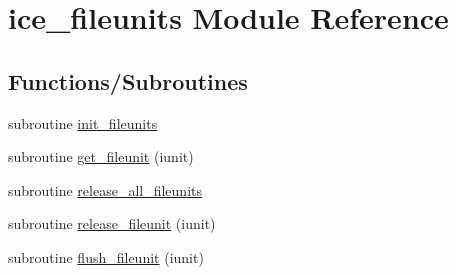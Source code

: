 \hypertarget{namespaceice__fileunits}{
\section{ice\_\-fileunits Module Reference}
\label{namespaceice__fileunits}
}
\subsection*{Functions/Subroutines}
\begin{DoxyCompactItemize}
\item 
subroutine \hyperlink{namespaceice__fileunits_adf82bd4005c28d7632bc120150ca5ebc}{init\_\-fileunits}
\item 
subroutine \hyperlink{namespaceice__fileunits_ad6283e44cc881fd1d0d6250cbb83a2e2}{get\_\-fileunit} (iunit)
\item 
subroutine \hyperlink{namespaceice__fileunits_a6e1bf3b046e5d9d67076539af78445ef}{release\_\-all\_\-fileunits}
\item 
subroutine \hyperlink{namespaceice__fileunits_a6edc4f5f2fe087f5651f7d4b7f595eeb}{release\_\-fileunit} (iunit)
\item 
subroutine \hyperlink{namespaceice__fileunits_a78c54163676e7d85998ab6bd968c1c52}{flush\_\-fileunit} (iunit)
\end{DoxyCompactItemize}

